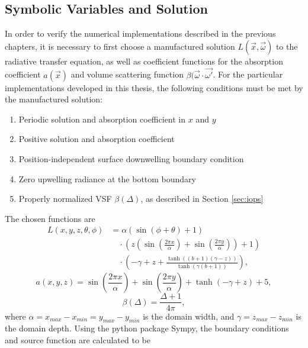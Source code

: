 \subsection{Symbolic Variables and Solution}
In order to verify the numerical implementations described in the previous chapters, it is necessary to first choose a manufactured solution $L(\vec{x}, \vec{\omega})$ to the radiative transfer equation, as well as coefficient functions for the absorption coefficient $a(\vec{x})$ and volume scattering function $\beta(\vec{\omega}\cdot{\vec{\omega'}}$.
For the particular implementations developed in this thesis, the following conditions must be met by the manufactured solution:
\begin{enumerate}
  \item Periodic solution and absorption coefficient in $x$ and $y$
  \item Positive solution and absorption coefficient
  \item Position-independent surface downwelling boundary condition
  \item Zero upwelling radiance at the bottom boundary
  \item Properly normalized VSF $\beta(\Delta)$, as described in Section \ref{sec:iops}
\end{enumerate}
The chosen functions are
\begin{align}
  L(x, y, z, \theta, \phi) &=
    \alpha \left(\sin{\left (\phi + \theta \right )} + 1\right) \nonumber\\
    &\quad\cdot \left(z \left(\sin{\left (\frac{2 \pi x}{\alpha} \right )} + \sin{\left (\frac{2 \pi y}{\alpha} \right )}\right) + 1\right) \nonumber\\
    &\quad\cdot \left(- \gamma + z + \frac{\tanh{\left (\left(b + 1\right) \left(\gamma - z\right) \right )}}{\tanh{\left (\gamma \left(b + 1\right) \right )}}\right),
  \label{eqn:mms_sol_expr}
\end{align}
\begin{equation}
  a(x, y, z) = \sin{\left (\frac{2 \pi x}{\alpha} \right )} + \sin{\left (\frac{2 \pi y}{\alpha} \right )} + \tanh{\left (- \gamma + z \right )} + 5,
  \label{eqn:mms_abs_expr}
\end{equation}
\begin{equation}
  \beta(\Delta) = \frac{\Delta + 1}{4 \pi},
  \label{eqn:mms_vsf_expr}
\end{equation}
where $\alpha=x_{max}-x_{min}=y_{max}-y_{min}$ is the domain width, and $\gamma=z_{max}-z_{min}$ is the domain depth.
Using the python package Sympy, the boundary conditions and source function are calculated to be

